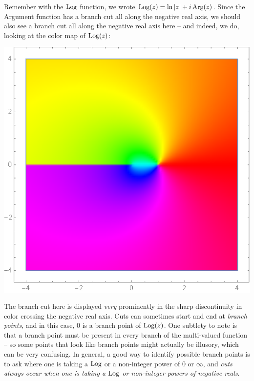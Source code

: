 \documentclass[12pt]{scrartcl}
\begin{document}
Remember with the $\operatorname*{Log}$ function, we wrote $\operatorname*{Log}(z) = \ln|z| + i\operatorname*{Arg}(z)$. Since the Argument function has a branch cut all along the negative real axis, we should also see a branch cut all along the negative real axis here -- and indeed, we do, looking at the color map of $\operatorname*{Log}(z)$:
\begin{center}
	\includegraphics[scale=0.27]{images/colorlogz.png}
\end{center}
The branch cut here is displayed \textit{very} prominently in the sharp discontinuity in color crossing the negative real axis. Cuts can sometimes start and end at \textit{branch points}, and in this case, 0 is a branch point of $\operatorname*{Log}(z)$. One subtlety to note is that a branch point must be present in every branch of the multi-valued function -- so some points that look like branch points might actually be illusory, which can be very confusing. In general, a good way to identify possible branch points is to ask where one is taking a $\operatorname*{Log}$ or a non-integer power of 0 or $\infty$, and \textit{cuts always occur when one is taking a $\operatorname*{Log}$ or non-integer powers of negative reals}.
\end{document}
